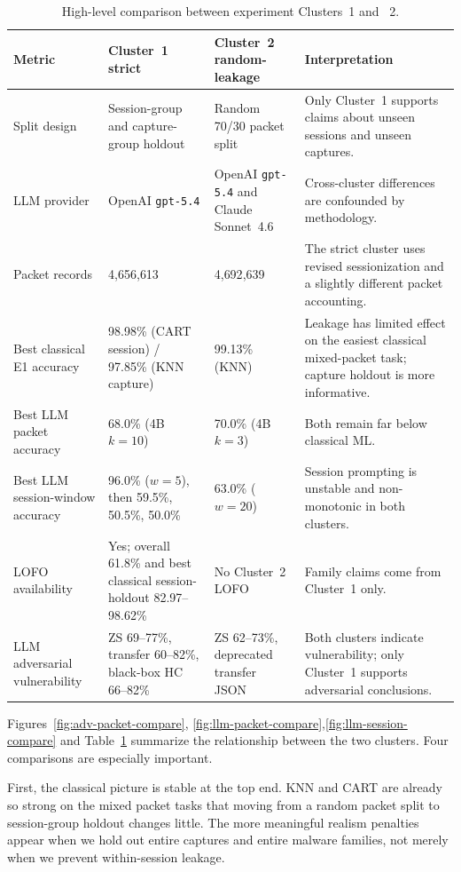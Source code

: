 \documentclass[conference]{IEEEtran}
\begin{document}
\begin{table}[t]
\centering
\caption{High-level comparison between experiment Clusters~1 and ~2.}
\label{tab:cluster-compare}
\footnotesize
\begin{tabularx}{\textwidth}{p{3.2cm}p{3.0cm}p{3.0cm}X}
\toprule
Metric & Cluster~1 strict & Cluster~2 random-leakage & Interpretation \\
\midrule
Split design & Session-group and capture-group holdout & Random 70/30 packet split & Only Cluster~1 supports claims about unseen sessions and unseen captures. \\
LLM provider & OpenAI \texttt{gpt-5.4} & {OpenAI \texttt{gpt-5.4} and Claude Sonnet~4.6} & Cross-cluster differences are confounded by methodology. \\
Packet records & 4{,}656{,}613 & 4{,}692{,}639 & The strict cluster uses revised sessionization and a slightly different packet accounting. \\
Best classical E1 accuracy & 98.98\% (CART session) / 97.85\% (KNN capture) & 99.13\% (KNN) & Leakage has limited effect on the easiest classical mixed-packet task; capture holdout is more informative. \\
Best LLM packet accuracy & 68.0\% (4B $k=10$) & 70.0\% (4B $k=3$) & Both remain far below classical ML. \\
Best LLM session-window accuracy & 96.0\% ($w=5$), then 59.5\%, 50.5\%, 50.0\% & 63.0\% ($w=20$) & Session prompting is unstable and non-monotonic in both clusters. \\
LOFO availability & Yes; overall 61.8\% and best classical session-holdout 82.97--98.62\% & No Cluster~2 LOFO & Family claims come from Cluster~1 only. \\
LLM adversarial vulnerability & ZS 69--77\%, transfer 60--82\%, black-box HC 66--82\% & ZS 62--73\%, deprecated transfer JSON & Both clusters indicate vulnerability; only Cluster~1 supports adversarial conclusions. \\
\bottomrule
\end{tabularx}
\end{table}

Figures~\ref{fig:adv-packet-compare}, \ref{fig:llm-packet-compare},\ref{fig:llm-session-compare} and Table~\ref{tab:cluster-compare} summarize the relationship between the two clusters. Four comparisons are especially important.

First, the classical picture is stable at the top end. KNN and CART are already so strong on the mixed packet tasks that moving from a random packet split to session-group holdout changes little. The more meaningful realism penalties appear when we hold out entire captures and entire malware families, not merely when we prevent within-session leakage.
\end{document}
